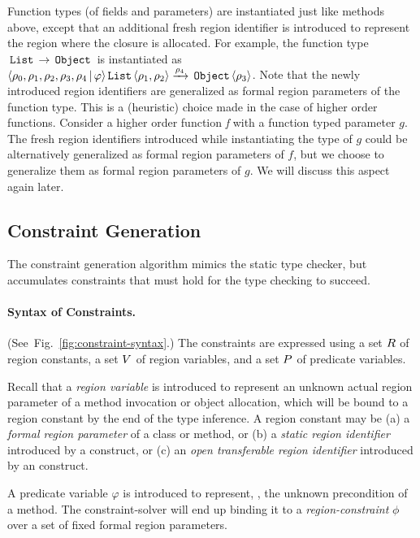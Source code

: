 Function types (of fields and parameters) are instantiated just like methods above, except that
an additional fresh region identifier is introduced to represent the region where the closure is
allocated.
For example, the function type $\,{\tt List}\, \rightarrow \,{\tt Object}\,$ is instantiated as
$\langle \rho_0, \rho_1, \rho_2, \rho_3, \rho_4 \,|\, \varphi  \rangle \,{\tt List}\, \langle \rho_1,\rho_2 \rangle \xrightarrow{\rho_4} \,{\tt Object}\,\langle \rho_3 \rangle$.
Note that the newly introduced region identifiers are generalized as formal region parameters of the function type.
This is a (heuristic) choice made in the case of higher order functions.
Consider a higher order function \emph{f} with a function typed parameter $g$.
The fresh region identifiers introduced while instantiating the type of $g$ could be
alternatively generalized as formal region parameters of $f$, but we choose to
generalize them as formal region parameters of $g$.
We will discuss this aspect again later.

\subsection{Constraint Generation}
\label{sec:fb-constraintsem}

The constraint generation algorithm mimics the static type checker, but accumulates
constraints that must hold for the type checking to succeed.

\paragraph{Syntax of Constraints.}
(See~Fig.~\ref{fig:constraint-syntax}.)
The constraints are expressed using a set $R$ of region constants,
a set $V$ of region variables, and a set $P$ of predicate variables.



Recall that a \emph{region variable} is introduced to represent an unknown actual region parameter
of a method invocation or object allocation, which will be bound to a region constant by the end of the
type inference.
A region constant may be 
(a) a \emph{formal region parameter} of a class or method, or
(b) a \emph{static region identifier} introduced by a  construct, or
(c) an  \emph{open transferable region identifier} introduced by an  construct.

A predicate variable $\varphi$ is introduced to represent, \eg, the unknown precondition of a method.
The constraint-solver will end up binding it to a \emph{region-constraint} $\phi$
over a set of fixed formal region parameters.

